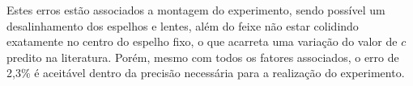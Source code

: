 Estes erros estão associados a montagem do experimento, sendo
possível um desalinhamento dos espelhos e lentes, além do feixe não estar colidindo exatamente no
centro do espelho fixo, o que acarreta uma variação do valor de $c$ predito na literatura. Porém, mesmo com todos os fatores associados, o erro  de
2,3\% é aceitável dentro da precisão necessária para a realização
do experimento.

